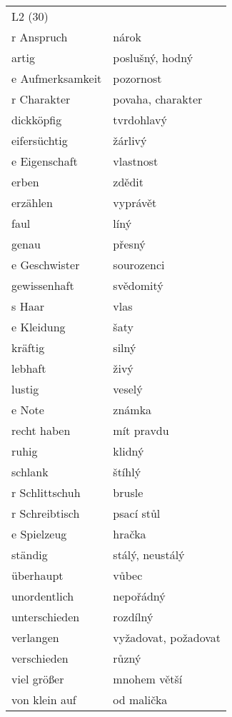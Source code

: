 \documentclass{article}
\begin{document}
\begin{tabular}{ p{5cm}|p{5cm}  }
\\
    L2 (30) \\
    r Anspruch & nárok\\
    artig & poslušný, hodný\\
    e Aufmerksamkeit & pozornost\\
    r Charakter & povaha, charakter\\
    dickköpfig & tvrdohlavý\\
    eifersüchtig & žárlivý\\
    e Eigenschaft & vlastnost\\
    erben & zdědit\\
    erzählen & vyprávět\\
    faul & líný\\
    genau & přesný\\
    e Geschwister & sourozenci\\
    gewissenhaft & svědomitý\\
    s Haar & vlas\\
    e Kleidung & šaty\\
    kräftig & silný\\
    lebhaft & živý\\
    lustig & veselý\\
    e Note & známka\\
    recht haben & mít pravdu\\
    ruhig & klidný\\
    schlank & štíhlý\\
    r Schlittschuh & brusle\\
    r Schreibtisch & psací stůl\\
    e Spielzeug & hračka\\
    ständig & stálý, neustálý\\
    überhaupt & vůbec\\
    unordentlich & nepořádný\\
    unterschieden & rozdílný\\
    verlangen & vyžadovat, požadovat\\
    verschieden & různý\\
    viel grö{\ss}er & mnohem větší\\
    von klein auf & od malička\\
\end{tabular}
\end{document}
